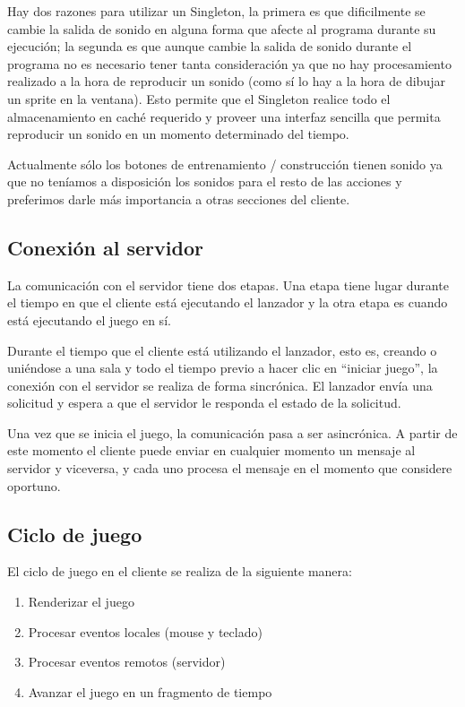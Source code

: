 \documentclass[titlepage,a4paper,12pt]{article}
\begin{document}
Hay dos razones para utilizar un Singleton, la primera es que dificilmente se cambie la salida de sonido en alguna forma que afecte al programa durante su ejecución; la segunda es que aunque cambie la salida de sonido durante el programa no es necesario tener tanta consideración ya que no hay procesamiento realizado a la hora de reproducir un sonido (como sí lo hay a la hora de dibujar un sprite en la ventana). Esto permite que el Singleton realice todo el almacenamiento en caché requerido y proveer una interfaz sencilla que permita reproducir un sonido en un momento determinado del tiempo.

Actualmente sólo los botones de entrenamiento / construcción tienen sonido ya que no teníamos a disposición los sonidos para el resto de las acciones y preferimos darle más importancia a otras secciones del cliente.

\subsection{Conexión al servidor}
La comunicación con el servidor tiene dos etapas. Una etapa tiene lugar durante el tiempo en que el cliente está ejecutando el lanzador y la otra etapa es cuando está ejecutando el juego en sí.

Durante el tiempo que el cliente está utilizando el lanzador, esto es, creando o uniéndose a una sala y todo el tiempo previo a hacer clic en ``iniciar juego'', la conexión con el servidor se realiza de forma sincrónica. El lanzador envía una solicitud y espera a que el servidor le responda el estado de la solicitud.

Una vez que se inicia el juego, la comunicación pasa a ser asincrónica. A partir de este momento el cliente puede enviar en cualquier momento un mensaje al servidor y viceversa, y cada uno procesa el mensaje en el momento que considere oportuno.

\subsection{Ciclo de juego}
El ciclo de juego en el cliente se realiza de la siguiente manera:
\begin{enumerate}
    \item Renderizar el juego
    \item Procesar eventos locales (mouse y teclado)
    \item Procesar eventos remotos (servidor)
    \item Avanzar el juego en un fragmento de tiempo
\end{enumerate}
\end{document}

